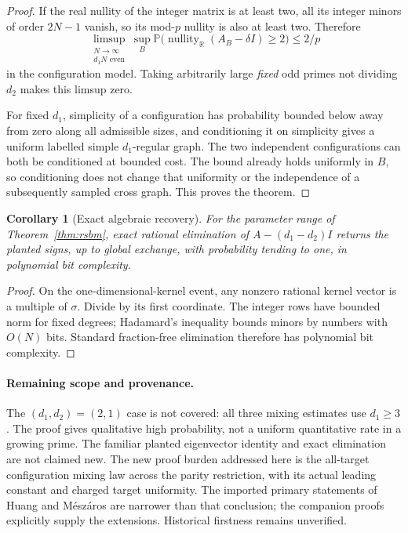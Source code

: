 \documentclass[11pt]{article}
\newtheorem{corollary}{Corollary}
\newcommand{\R}{\mathbb R}
\newcommand{\Prob}{\mathbb P}
\newcommand{\nullity}{\operatorname{nullity}}
\begin{document}
\begin{proof}
If the real nullity of the integer matrix is at least two, all its
integer minors of order $2N-1$ vanish, so its mod-$p$ nullity is also
at least two. Therefore
\[
 \limsup_{\substack{N\to\infty\\d_1N\text{ even}}}
 \sup_B\Prob\bigl(\nullity_{\R}(A_B-\delta I)\ge2\bigr)
 \le2/p
\]
in the configuration model. Taking arbitrarily large \emph{fixed}
odd primes not dividing $d_2$ makes this limsup zero.

For fixed $d_1$, simplicity of a configuration has probability
bounded below away from zero along all admissible sizes, and
conditioning it on simplicity gives a uniform labelled simple
$d_1$-regular graph. The two independent configurations can both be
conditioned at bounded cost. The bound already holds uniformly in
$B$, so conditioning does not change that uniformity or the independence
of a subsequently sampled cross graph. This proves the theorem.
\end{proof}

\begin{corollary}[Exact algebraic recovery]
For the parameter range of Theorem~\ref{thm:rsbm}, exact rational
elimination of $A-(d_1-d_2)I$ returns the planted signs, up to global
exchange, with probability tending to one, in polynomial bit complexity.
\end{corollary}
\begin{proof}
On the one-dimensional-kernel event, any nonzero rational kernel
vector is a multiple of $\sigma$. Divide by its first coordinate.
The integer rows have bounded norm for fixed degrees; Hadamard's
inequality bounds minors by numbers with $O(N)$ bits. Standard
fraction-free elimination therefore has polynomial bit complexity.
\end{proof}

\paragraph{Remaining scope and provenance.}
The $(d_1,d_2)=(2,1)$ case is not covered: all three mixing estimates
use $d_1\ge3$. The proof gives qualitative high probability, not a
uniform quantitative rate in a growing prime. The familiar planted
eigenvector identity and exact elimination are not claimed new.
The new proof burden addressed here is the all-target configuration
mixing law across the parity restriction, with its actual leading
constant and charged target uniformity. The imported primary statements
of Huang and M\'esz\'aros are narrower than that conclusion; the
companion proofs explicitly supply the extensions. Historical firstness
remains unverified.
\end{document}
